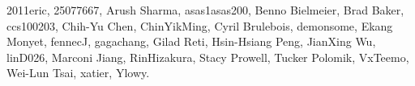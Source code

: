 2011eric,            %
25077667,            %
Arush Sharma,        %
asas1asas200,        %
Benno Bielmeier,     %
Brad Baker,          %
ccs100203,           %
Chih-Yu Chen,        %
ChinYikMing,         %
Cyril Brulebois,     %
demonsome,           %
Ekang Monyet,        %
fennecJ,             %
gagachang,           %
Gilad Reti,          %
Hsin-Hsiang Peng,    %
JianXing Wu,         %
linD026,             %
Marconi Jiang,       %
RinHizakura,         %
Stacy Prowell,       %
Tucker Polomik,      %
VxTeemo,             %
Wei-Lun Tsai,        %
xatier,              %
Ylowy.               %
